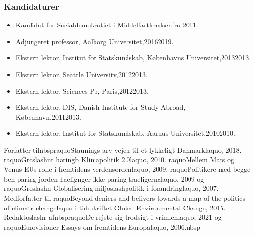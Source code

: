 \documentclass[11pt, a4paper]{awesome-cv}
\begin{document}
\begin{cvletter}
\subsubsection*{Kandidaturer}
\begin{itemize}
\item Kandidat for Socialdemokratiet i Middelfartkredsenfra 2011.
\end{itemize}
\begin{itemize}
\item Adjungeret professor, Aalborg Universitet,20162019.
\item Ekstern lektor, Institut for Statskundskab, Københavns Universitet,20132013.
\item Ekstern lektor, Seattle University,20122013.
\item Ekstern lektor, Sciences Po, Paris,20122013.
\item Ekstern lektor, DIS, Danish Institute for Study Abroad, København,20112013.
\item Ekstern lektor, Institut for Statskundskab, Aarhus Universitet,20102010.
\end{itemize}
Forfatter tilnbspraquoStaunings arv  vejen til et lykkeligt Danmarklaquo, 2018. raquoGroslashnt haringb  Klimapolitik 2.0laquo, 2010. raquoMellem Mars og Venus  EUs rolle i fremtidens verdensordenlaquo, 2009. raquoPolitikere med begge ben paring jorden haelignger ikke paring traeligernelaquo, 2009 og raquoGroslashn Globalisering  miljoslashpolitik i forandringlaquo, 2007. Medforfatter til raquoBeyond deniers and belivers  towards a map of the politics of climate changelaquo i tidsskriftet Global Environmental Change, 2015. Redaktoslashr afnbspraquoDe rejste sig trodsigt i vrimlenlaquo, 2021 og raquoEurovisioner  Essays om fremtidens Europalaquo, 2006.nbsp

\end{cvletter}
\end{document}
